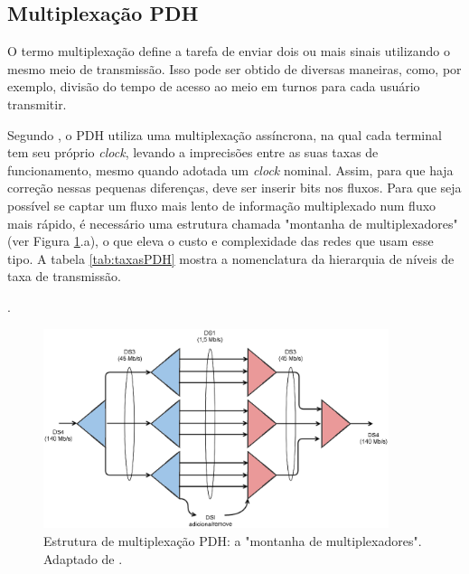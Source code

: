 \subsection{Multiplexação PDH}

O termo multiplexação define a tarefa de enviar dois ou mais sinais utilizando o mesmo meio de transmissão. Isso pode ser obtido de diversas maneiras, como, por exemplo, divisão do tempo de acesso ao meio em turnos para cada usuário transmitir.

Segundo \cite{Ramaswami2010}, o PDH utiliza uma multiplexação assíncrona, na qual cada terminal tem seu próprio \textit{clock}, levando a imprecisões entre as suas taxas de funcionamento, mesmo quando adotada um \textit{clock} nominal. Assim, para que haja correção nessas pequenas diferenças, deve ser inserir bits nos fluxos. Para que seja possível se captar um fluxo mais lento de informação multiplexado num fluxo mais rápido, é necessário uma estrutura chamada "montanha de multiplexadores" (ver Figura \ref{fig:muxPDH}.a), o que eleva o custo e complexidade das redes que usam esse tipo. A tabela \ref{tab:taxasPDH} mostra a nomenclatura da hierarquia de níveis de taxa de transmissão.

\begin{table}
\centering
{}
\caption{\label{tab:taxasPDH}As taxas de transmissão de sinais assíncronos e quase-síncronos (como padronizado na América do Norte e na Europa). A sigla DS vem de "\textit{Digital Signal}". Adaptado de \cite{Ramaswami2010}.}.
\end{table}

\begin{figure}
\centering
\includegraphics[width=0.9\textwidth]{image/mux_pdh.eps}
\caption{\label{fig:muxPDH} Estrutura de multiplexação PDH: a "montanha de multiplexadores". Adaptado de \cite{Ramaswami2010}.}
\end{figure}